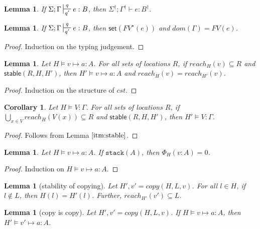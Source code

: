 \documentclass[11pt]{article}
\newcommand{\irl}[1]{\mathtt{#1}}
\newcommand{\stable}[1]{\mathsf{stable}(#1)}
\newcommand{\set}[1]{\mathsf{set}(#1)}
\newcommand{\stack}[1]{\irl{stack}(#1)}
\newtheorem{lemma}[theorem]{Lemma}
\newtheorem{corollary}{Corollary}[theorem]
\theoremstyle{definition}
\begin{document}
\begin{lemma}
\label{a} If $\Sigma; \Gamma \sststile{q'}{q} e : B$, then $\Sigma^{\dagger}; \Gamma^{\dagger} \vdash e : B^{\dagger}$.
\end{lemma}

\begin{lemma}\label{itm:linear}
\label{a} If $\Sigma; \Gamma \sststile{q'}{q} e : B$, then $\set{FV^{\star}(e)}$ and $dom(\Gamma) = FV(e)$.
\end{lemma}

\begin{proof}
Induction on the typing judgement.
\end{proof}

\begin{lemma}\label{itm:stable}
Let $H \vDash v \mapsto a : A$. For all sets of locations $R$, if $reach_H(v) \subseteq R$ and $\stable{R,H,H'}$, then $H' \vDash v \mapsto a : A$ and $reach_H(v) = reach_{H'}(v)$.
\end{lemma}

\begin{proof}
Induction on the structure of $cst$.
\end{proof}

\begin{corollary}
Let $H \vDash V : \Gamma$. For all sets of locations $R$, if $\bigcup_{x \in V} reach_H(V(x)) \subseteq R$ and $\stable{R,H,H'}$, then $H' \vDash V : \Gamma$.
\end{corollary}

\begin{proof}
Follows from Lemma $\ref{itm:stable}$.
\end{proof}

\begin{lemma}\label{itm:stack}
Let $H \vDash v \mapsto a : A$. If $\stack{A}$, then $\Phi_H(v:A) = 0$.
\end{lemma}

\begin{proof}
Induction on $H \vDash v \mapsto a : A$.
\end{proof}


\begin{lemma}[stability of copying]\label{itm:copyStable}
	Let $H',v' = copy(H,L,v)$. For all $l \in H$, if $l \notin L$, then $H(l) = H'(l)$. 
	Further, $reach_{H'}(v') \subseteq L$.
\end{lemma}

\begin{lemma}[copy is copy]\label{itm:copyIsCopy}
	Let $H',v' = copy(H,L,v)$. If $H \vDash v \mapsto a : A$, then $H' \vDash v' \mapsto a : A$.
\end{lemma}
\end{document}
